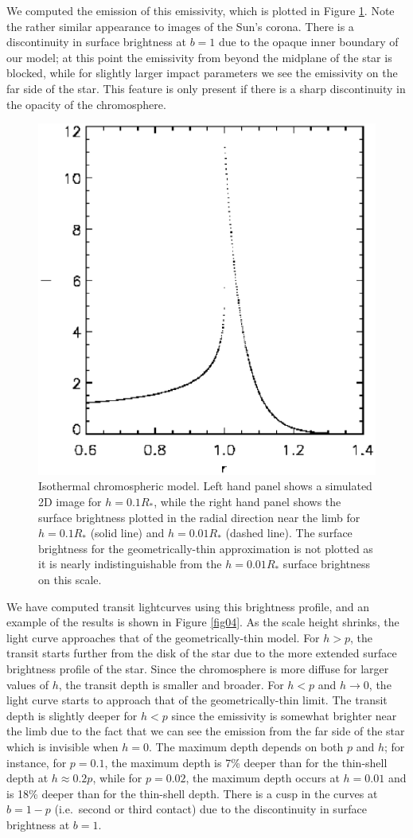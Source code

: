 \documentclass[twocolumn]{emulateapj}
\begin{document}
We computed the emission of this emissivity, which is plotted in
Figure \ref{fig03}.  Note the rather similar appearance to images of
the Sun's corona.  There is a discontinuity in surface brightness at
$b=1$ due to the opaque inner boundary of our model; at this point the
emissivity from beyond the midplane of the star is blocked, while for
slightly larger impact parameters we see the emissivity on the far
side of the star.  This feature is only present if there is a sharp
discontinuity in the opacity of the chromosphere.

\begin{figure}
\includegraphics[width=0.5 \textwidth]{chromosphere_surface_brightness.eps}
\caption{Isothermal chromospheric model. Left hand panel shows a simulated 2D
image for $h=0.1R_*$, while the right hand panel shows the
surface brightness plotted in the radial direction near
the limb for $h=0.1R_*$ (solid line) and $h=0.01R_*$
(dashed line).  The surface brightness for the geometrically-thin
approximation is not plotted as it is nearly indistinguishable from 
the $h=0.01R_*$ surface brightness on this scale.}
\label{fig03}
\end{figure}

We have computed transit lightcurves using this brightness
profile, and an example of the results is shown in Figure
\ref{fig04}.  As the scale height shrinks, the light
curve approaches that of the geometrically-thin model.
For $h > p$, the transit starts further from the disk of
the star due to the more extended surface brightness profile
of the star.  Since the chromosphere is more diffuse for
larger values of $h$, the transit depth is smaller and
broader.  For $h < p$ and $h \rightarrow 0$, the light curve 
starts  to approach that of the geometrically-thin limit.
The transit depth is slightly deeper for $h<p$ since the
emissivity is somewhat brighter near the limb due to
the fact that we can see the emission from the far side
of the star which is invisible when $h=0$.  The maximum
depth depends on both $p$ and $h$; for instance, for 
$p=0.1$, the maximum depth is 7\% deeper than for
the thin-shell depth at $h \approx 0.2 p$, while
for $p=0.02$, the maximum depth occurs at $h=0.01$
and is 18\% deeper than for the thin-shell depth.
There is a cusp in the curves at $b=1-p$ (i.e.\ second or third 
contact) due to the discontinuity in surface brightness at 
$b=1$.
\end{document}
